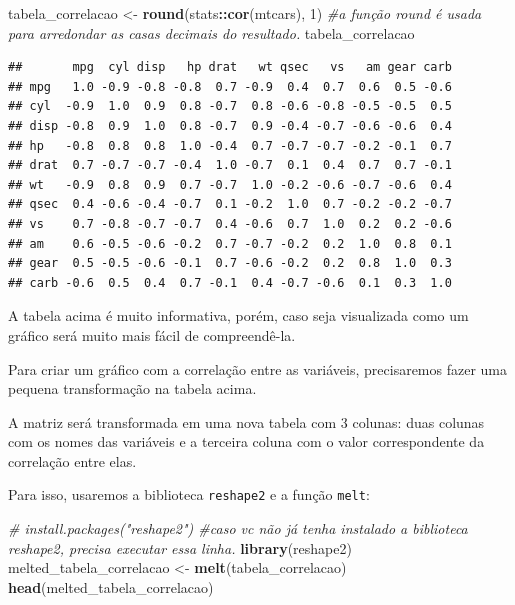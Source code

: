 \documentclass[
]{book}
\newenvironment{Shaded}{\begin{snugshade}}{\end{snugshade}}
\newcommand{\CommentTok}[1]{\textcolor[rgb]{0.56,0.35,0.01}{\textit{#1}}}
\newcommand{\DecValTok}[1]{\textcolor[rgb]{0.00,0.00,0.81}{#1}}
\newcommand{\KeywordTok}[1]{\textcolor[rgb]{0.13,0.29,0.53}{\textbf{#1}}}
\newcommand{\NormalTok}[1]{#1}
\newcommand{\OperatorTok}[1]{\textcolor[rgb]{0.81,0.36,0.00}{\textbf{#1}}}
\newcommand{\StringTok}[1]{\textcolor[rgb]{0.31,0.60,0.02}{#1}}
\begin{document}
\begin{Shaded}
\begin{Highlighting}[]
\NormalTok{tabela_correlacao <-}\StringTok{ }\KeywordTok{round}\NormalTok{(stats}\OperatorTok{::}\KeywordTok{cor}\NormalTok{(mtcars), }\DecValTok{1}\NormalTok{) }\CommentTok{#a função round é usada para arredondar as casas decimais do resultado.}
\NormalTok{tabela_correlacao}
\end{Highlighting}
\end{Shaded}

\begin{verbatim}
##       mpg  cyl disp   hp drat   wt qsec   vs   am gear carb
## mpg   1.0 -0.9 -0.8 -0.8  0.7 -0.9  0.4  0.7  0.6  0.5 -0.6
## cyl  -0.9  1.0  0.9  0.8 -0.7  0.8 -0.6 -0.8 -0.5 -0.5  0.5
## disp -0.8  0.9  1.0  0.8 -0.7  0.9 -0.4 -0.7 -0.6 -0.6  0.4
## hp   -0.8  0.8  0.8  1.0 -0.4  0.7 -0.7 -0.7 -0.2 -0.1  0.7
## drat  0.7 -0.7 -0.7 -0.4  1.0 -0.7  0.1  0.4  0.7  0.7 -0.1
## wt   -0.9  0.8  0.9  0.7 -0.7  1.0 -0.2 -0.6 -0.7 -0.6  0.4
## qsec  0.4 -0.6 -0.4 -0.7  0.1 -0.2  1.0  0.7 -0.2 -0.2 -0.7
## vs    0.7 -0.8 -0.7 -0.7  0.4 -0.6  0.7  1.0  0.2  0.2 -0.6
## am    0.6 -0.5 -0.6 -0.2  0.7 -0.7 -0.2  0.2  1.0  0.8  0.1
## gear  0.5 -0.5 -0.6 -0.1  0.7 -0.6 -0.2  0.2  0.8  1.0  0.3
## carb -0.6  0.5  0.4  0.7 -0.1  0.4 -0.7 -0.6  0.1  0.3  1.0
\end{verbatim}

A tabela acima é muito informativa, porém, caso seja visualizada como um
gráfico será muito mais fácil de compreendê-la.

Para criar um gráfico com a correlação entre as variáveis, precisaremos
fazer uma pequena transformação na tabela acima.

A matriz será transformada em uma nova tabela com 3 colunas: duas
colunas com os nomes das variáveis e a terceira coluna com o valor
correspondente da correlação entre elas.

Para isso, usaremos a biblioteca \texttt{reshape2} e a função
\texttt{melt}:

\begin{Shaded}
\begin{Highlighting}[]
\CommentTok{# install.packages("reshape2")  #caso vc não já tenha instalado a biblioteca reshape2, precisa executar essa linha.}
\KeywordTok{library}\NormalTok{(reshape2)}
\NormalTok{melted_tabela_correlacao <-}\StringTok{ }\KeywordTok{melt}\NormalTok{(tabela_correlacao)}
\KeywordTok{head}\NormalTok{(melted_tabela_correlacao)}
\end{Highlighting}
\end{Shaded}
\end{document}
